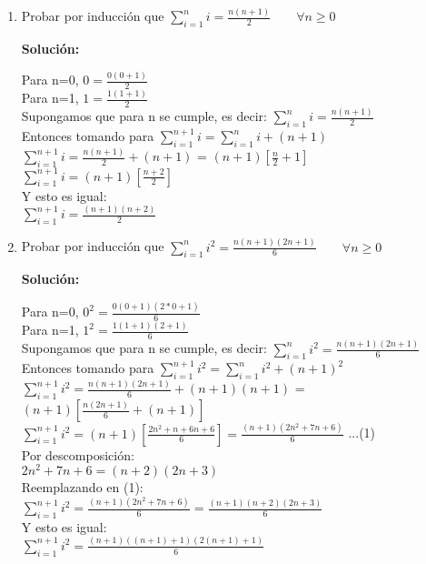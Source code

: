 \documentclass{article}
\begin{document}
\begin{enumerate}
  \item Probar por inducción que 
  \(\sum_{i=1}^{n}i=\frac{n(n+1)}{2} \qquad\forall n \geq 0\)
  
  \textbf{Solución:}
  
  Para n=0, \(0 =\frac{0(0+1)}{2} \) \\
  Para n=1, \(1 =\frac{1(1+1)}{2} \) \\
  Supongamos que para n se cumple, es decir:  \(\sum_{i=1}^{n}i=\frac{n(n+1)}{2}\) \\
  Entonces tomando para  \(\sum_{i=1}^{n+1}i=\sum_{i=1}^{n}i + (n+1) \)\\
  \(\sum_{i=1}^{n+1}i= \frac{n(n+1)}{2} + (n+1) \) = \((n+1) [ \frac{n}{2} + 1 ] \) \\
  \(\sum_{i=1}^{n+1}i= (n+1) [ \frac{n+2}{2} ] \) \\
  Y esto es igual:\\
   \(\sum_{i=1}^{n+1}i= \frac{(n+1) (n+2)}{2} \) \\
   
  \item Probar por inducción que
  \( \sum_{i=1}^{n}i^2=\frac{n(n+1)(2n+1)}{6} \qquad\forall n \geq 0\)
  
  \textbf{Solución:}
  
  Para n=0, \(0^2 =\frac{0(0+1)(2*0+1)}{6} \) \\
  Para n=1, \(1^2 =\frac{1(1+1)(2+1)}{6} \) \\
  Supongamos que para n se cumple, es decir:  \(\sum_{i=1}^{n}i^2=\frac{n(n+1)(2n+1)}{6}\) \\
  Entonces tomando para  \(\sum_{i=1}^{n+1}i^2=\sum_{i=1}^{n}i^2 + (n+1)^2 \)\\
  \(\sum_{i=1}^{n+1}i^2= \frac{n(n+1)(2n+1)}{6} + (n+1)(n+1) \) = \((n+1) [ \frac{n(2n+1)}{6} + (n+1) ] \) \\
  \(\sum_{i=1}^{n+1}i^2= (n+1) [ \frac{2n^2 + n + 6n + 6}{6} ] = \frac{(n+1) (2n^2+7n+6)}{6} \)  ...(1)\\
  Por descomposición:\\
  \( 2n^2 + 7n + 6  =  (n+2)(2n+3)\) \\
  Reemplazando en (1):\\
  \(\sum_{i=1}^{n+1}i^2=\frac{(n+1) (2n^2+7n+6)}{6} = \frac{(n+1)(n+2)(2n+3)}{6}\) \\
  Y esto es igual:\\
  \(\sum_{i=1}^{n+1}i^2 = \frac{(n+1)((n+1)+1)(2(n+1)+1)}{6}\) \\
  

\end{enumerate}
\end{document}
